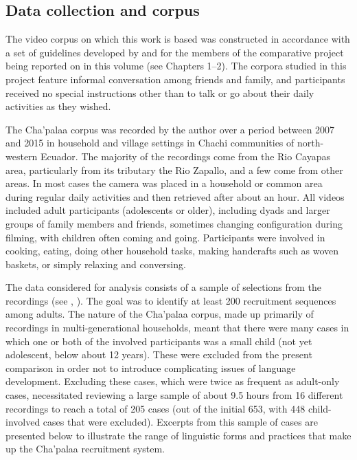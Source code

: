 \documentclass[output=paper]{langsci/langscibook}
\begin{document}
\subsection{Data collection and corpus}\label{sec:floyd:1.2}

The video corpus on which this work is based was constructed in accordance with a set of guidelines developed by and for the members of the comparative project being reported on in this volume (see Chapters 1--2). The corpora studied in this project feature informal conversation among friends and family, and participants received no special instructions other than to talk or go about their daily activities as they wished.

The Cha’palaa corpus was recorded by the author over a period between 2007 and 2015 in household and village settings in Chachi communities of north-west\-ern Ecuador. The majority of the recordings come from the Rio Cayapas area, particularly from its tributary the Rio Zapallo, and a few come from other areas. In most cases the camera was placed in a household or common area during regular daily activities and then retrieved after about an hour. All videos included adult participants (adolescents or older), including dyads and larger groups of family members and friends, sometimes changing configuration during filming, with children often coming and going. Participants were involved in cooking, eating, doing other household tasks, making handcrafts such as woven baskets, or simply relaxing and conversing.

The data considered for analysis consists of a sample of selections from the recordings (see , ). The goal was to identify at least 200 recruitment sequences among adults. The nature of the Cha’palaa corpus, made up primarily of recordings in multi-generational households, meant that there were many cases in which one or both of the involved participants was a small child (not yet adolescent, below about 12 years). These were excluded from the present comparison  in order not to introduce complicating issues of language development. Excluding these cases, which were twice as frequent as adult-only cases, necessitated reviewing a large sample of about 9.5 hours from 16 different recordings to reach a total of 205 cases (out of the initial 653, with 448 child-involved cases that were excluded). Excerpts from this sample of cases are presented below to illustrate the range of linguistic forms and practices that make up the Cha’palaa recruitment system.
\end{document}
